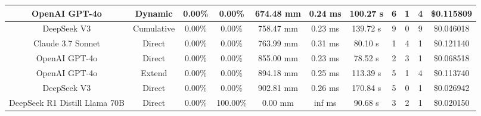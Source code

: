 \begin{landscape}
\begin{table}[H]
\begin{center}
\begin{tabular}{|c|c|c|c|c|c|c|c|c|c|c|}
    \hline
    OpenAI GPT-4o & Dynamic & 0.00\% & 0.00\% & 674.48 mm & 0.24 ms & 100.27 s & 6 & 1 & 4 & \$0.115809 \\
    \hline
    DeepSeek V3 & Cumulative & 0.00\% & 0.00\% & 758.47 mm & 0.23 ms & 139.72 s & 9 & 0 & 9 & \$0.046018 \\
    \hline
    Claude 3.7 Sonnet & Direct & 0.00\% & 0.00\% & 763.99 mm & 0.31 ms & 80.10 s & 1 & 4 & 1 & \$0.121140 \\
    \hline
    OpenAI GPT-4o & Direct & 0.00\% & 0.00\% & 855.00 mm & 0.23 ms & 78.52 s & 2 & 3 & 1 & \$0.068518 \\
    \hline
    OpenAI GPT-4o & Extend & 0.00\% & 0.00\% & 894.18 mm & 0.25 ms & 113.39 s & 5 & 1 & 4 & \$0.113740 \\
    \hline
    DeepSeek V3 & Direct & 0.00\% & 0.00\% & 902.81 mm & 0.26 ms & 170.84 s & 5 & 0 & 1 & \$0.026942 \\
    \hline
    DeepSeek R1 Distill Llama 70B & Direct & 0.00\% & 100.00\% & 0.00 mm & inf ms & 90.68 s & 3 & 2 & 1 & \$0.020150 \\
    \hline
\end{tabular}
\label{Results-Position-1-3}
\end{center}
\end{table}


\end{landscape}
